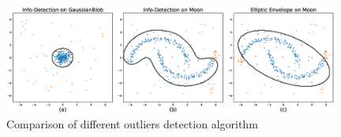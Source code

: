 \documentclass{article}
\begin{document}
\begin{figure}[!ht]
	\centering
	\includegraphics[width=11cm]{pic/outlier_boundary_illustration.eps}
	\caption{Comparison of different outliers detection algorithm}\label{fig:outlier}
\end{figure}


\end{document}
